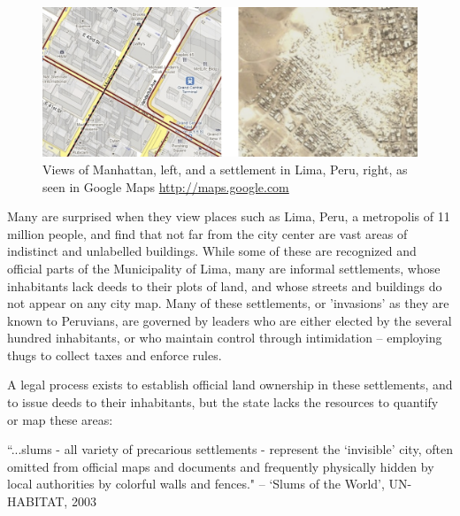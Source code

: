 \documentclass[11pt]{report}
\begin{document}
\begin{figure}[h]
	\begin{center}
		\includegraphics[width=1\textwidth]{images/two-worlds-mapping.png}
		Views of Manhattan, left, and a settlement in Lima, Peru, right, as seen in Google Maps \url{http://maps.google.com}
	\end{center}
\end{figure}

Many are surprised when they view places such as Lima, Peru, a metropolis of 11 million people, and find that not far from the city center are vast areas of indistinct and unlabelled buildings. While some of these are recognized and official parts of the Municipality of Lima, many are informal settlements, whose inhabitants lack deeds to their plots of land, and whose streets and buildings do not appear on any city map. Many of these settlements, or 'invasions' as they are known to Peruvians, are governed by leaders who are either elected by the several hundred inhabitants, or who maintain control through intimidation -- employing thugs to collect taxes and enforce rules. 

A legal process exists to establish official land ownership in these settlements, and to issue deeds to their inhabitants, but the state lacks the resources to quantify or map these areas:

``...slums - all variety of precarious settlements - represent the `invisible' city, often omitted from official maps and documents and frequently physically hidden by local authorities by colorful walls and fences." -- `Slums of the World', UN-HABITAT, 2003

\end{document}
